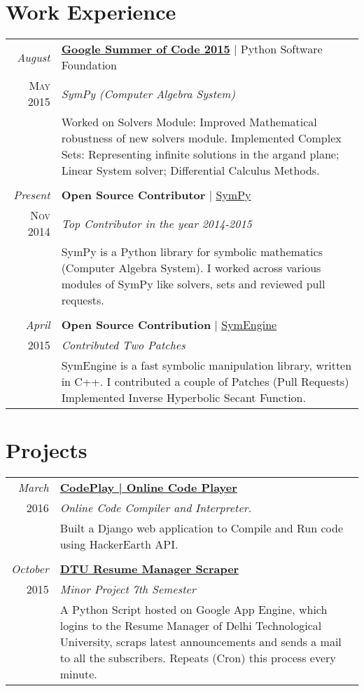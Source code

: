 \documentclass[a4paper,10pt]{article}
\begin{document}
\section{Work Experience}
\begin{tabular}{r|p{11cm}}
 
 \emph{August} & \textbf{\href{https://www.google-melange.com/gsoc/homepage/google/gsoc2015}{Google Summer of Code 2015}} | Python Software Foundation \\\textsc{May 2015}&\emph{SymPy (Computer Algebra System)}\\&\footnotesize{Worked on Solvers Module: Improved Mathematical robustness of new solvers module. Implemented Complex Sets: Representing infinite solutions in the argand plane; Linear System solver; Differential Calculus Methods.}\\\multicolumn{2}{c}{} \\
 
 \emph{Present} & \textbf{Open Source Contributor} | \href{http://www.sympy.org}{SymPy} \\\textsc{Nov 2014}&\emph{Top Contributor in the year 2014-2015}\\&\footnotesize{SymPy is a Python library for symbolic mathematics (Computer Algebra System). I worked across various modules of SymPy like solvers, sets and reviewed pull requests. }
 \\\multicolumn{2}{c}{} \\

 \emph{April} & \textbf{Open Source Contribution} |  \href{https://github.com/symengine/symengine/}{SymEngine} \\\textsc{2015}&\emph{Contributed Two Patches}\\&\footnotesize{SymEngine is a fast symbolic manipulation library, written in C++. I contributed a couple of Patches (Pull Requests) Implemented Inverse Hyperbolic Secant Function.}
\end{tabular}

\section{Projects}
\begin{tabular}{r|p{11cm}}

 \emph{March} & \textbf{\href{http://codeplay.me}{CodePlay | Online Code Player}} \\\textsc{2016}&\emph{Online Code Compiler and Interpreter.}\\&\footnotesize{Built a Django web application to Compile and Run code using HackerEarth API.} \\\multicolumn{2}{c}{} \\

 \emph{October} & \textbf{\href{https://github.com/aktech/dturmscrap}{DTU Resume Manager Scraper}} \\\textsc{2015}&\emph{Minor Project 7th Semester}\\&\footnotesize{A Python Script hosted on Google App Engine, which logins to the Resume Manager of Delhi Technological University, scraps latest announcements and sends a mail to all the subscribers. Repeats (Cron) this process every minute.}
\end{tabular}
\end{document}
